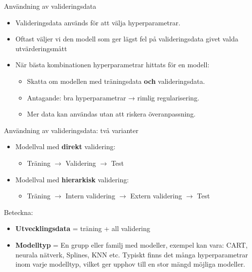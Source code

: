 \documentclass[10pt,english]{beamer}
\begin{document}
\begin{frame}{Användning av valideringsdata}
\begin{itemize}
    \item Valideringsdata används för att välja hyperparametrar.
    \item Oftast väljer vi den modell som ger lägst fel på valideringsdata givet valda utvärderingsmått
    \item När bästa kombinationen hyperparametrar hittats för en modell:
    \begin{itemize}
        \item Skatta om modellen med träningsdata \textbf{och} valideringsdata.
        \item Antagande: bra hyperparametrar → rimlig regularisering.
        \item Mer data kan användas utan att riskera överanpassning.
    \end{itemize}
\end{itemize}
\end{frame}

\begin{frame}{Användning av valideringsdata: två varianter}
\begin{itemize}
    \item Modellval med \textbf{direkt} validering:
    \begin{itemize}
      \item Träning $\rightarrow$ Validering $\rightarrow$ Test
    \end{itemize}
    \item Modellval med \textbf{hierarkisk} validering:
     \begin{itemize}
      \item Träning $\rightarrow$ Intern validering $\rightarrow$ Extern validering $\rightarrow$ Test
    \end{itemize}
\end{itemize}

Beteckna:
\begin{itemize}
    \item  \textbf{Utvecklingsdata} = träning + all validering
    \item \textbf{Modelltyp} = En grupp eller familj med modeller, exempel kan vara: CART, neurala nätverk,
      Splines, KNN etc. Typiskt finns det många hyperparametrar inom varje modelltyp, vilket ger
      upphov till en stor mängd möjliga modeller.
\end{itemize}


\end{frame}
\end{document}
